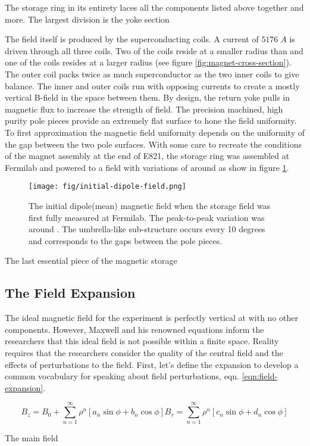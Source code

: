 The storage ring in its entirety laces all the components listed above together and more.  The largest division is the yoke section

The field itself is produced by the superconducting coils.  A current of $5176\;A$ is driven through all three coils.  Two of the coils reside at a smaller radius than \rmagic and one of the coils resides at a larger radius (see figure \ref{fig:magnet-cross-section}).  The outer coil packs twice as much superconductor as the two inner coils to give balance.  The inner and outer coils run with opposing currents to create a mostly vertical B-field in the space between them.  By design, the return yoke pulls in magnetic flux to increase the strength of field.  The precision machined, high purity pole pieces provide an extremely flat surface to hone the field uniformity.  To first approximation the magnetic field uniformity depends on the uniformity of the gap between the two pole surfaces.  With some care to recreate the  conditions of the magnet assembly at the end of E821, the storage ring was assembled at Fermilab and powered to a field with variations of around  as show in figure \ref{fig:initial-field}.

\begin{figure}
\texttt{[image: fig/initial-dipole-field.png]}
\caption{The initial dipole(mean) magnetic field when the storage field was first fully measured at Fermilab.  The peak-to-peak variation was around .  The umbrella-like sub-structure occurs every 10 degrees and corresponds to the gaps between the pole pieces.}
\label{fig:initial-field}
\end{figure}

The last essential piece of the magnetic storage

\subsection{The Field Expansion}

The ideal magnetic field for the experiment is perfectly vertical at \bmagic with no other components.  However, Maxwell and his renowned equations inform the researchers that this ideal field is not possible within a finite space.  Reality requires that the researchers consider the quality of the central field and the effects of perturbations to the field.  First, let's define the expansion to develop a common vocabulary for speaking about field perturbations, eqn. \ref{eqn:field-expansion}.

\begin{equation}
B_z = B_0 + \sum_{n=1}^{\infty} \rho^n[a_n \sin{\phi} + b_n \cos{\phi}]
B_r = \sum_{n=1}^{\infty} \rho^n[c_n \sin{\phi} + d_n \cos{\phi}]
\label{eqn:field-expansion}
\end{equation}

The main field






